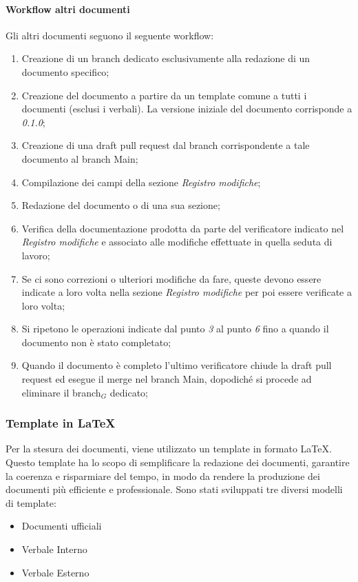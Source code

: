 \documentclass[10pt]{article}
\begin{document}
\begin{justify}
        \paragraph{Workflow altri documenti}
        Gli altri documenti seguono il seguente workflow:
        \begin{enumerate}
            \item Creazione di un branch dedicato esclusivamente alla redazione di un documento specifico;
            \item Creazione del documento a partire da un template comune a tutti i documenti (esclusi i verbali). La versione iniziale del documento corrisponde a \textit{0.1.0};
            \item Creazione di una draft pull request dal branch corrispondente a tale documento al branch Main;
            \item Compilazione dei campi della sezione \textit{Registro modifiche};
            \item Redazione del documento o di una sua sezione;
            \item Verifica della documentazione prodotta da parte del verificatore indicato nel \textit{Registro modifiche} e associato alle modifiche effettuate in quella seduta di lavoro;
            \item Se ci sono correzioni o ulteriori modifiche da fare, queste devono essere indicate a loro volta nella sezione \textit{Registro modifiche} per poi essere verificate a loro volta;
            \item Si ripetono le operazioni indicate dal punto \textit{3} al punto \textit{6} fino a quando il documento non è stato completato;
            \item Quando il documento è completo l'ultimo verificatore 
            chiude la draft pull request ed esegue il merge nel branch Main, dopodiché si procede ad eliminare il branch$_G$ dedicato;
        \end{enumerate}

    \subsubsection{Template in \LaTeX}
    Per la stesura dei documenti, viene utilizzato un template in formato \LaTeX. Questo template ha lo scopo di semplificare la redazione dei documenti, garantire la coerenza e risparmiare del tempo, in modo da rendere la produzione dei documenti più efficiente e professionale. Sono stati sviluppati tre diversi modelli di template:
    \begin{itemize}
        \item Documenti ufficiali
        \item Verbale Interno
        \item Verbale Esterno
    \end{itemize}


\end{justify}
\end{document}
